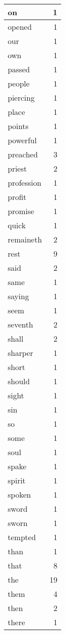 \begin{center}
\begin{longtable}{l|r}
on & 1\\ \hline 
opened & 1\\ \hline 
our & 1\\ \hline 
own & 1\\ \hline 
passed & 1\\ \hline 
people & 1\\ \hline 
piercing & 1\\ \hline 
place & 1\\ \hline 
points & 1\\ \hline 
powerful & 1\\ \hline 
preached & 3\\ \hline 
priest & 2\\ \hline 
profession & 1\\ \hline 
profit & 1\\ \hline 
promise & 1\\ \hline 
quick & 1\\ \hline 
remaineth & 2\\ \hline 
rest & 9\\ \hline 
said & 2\\ \hline 
same & 1\\ \hline 
saying & 1\\ \hline 
seem & 1\\ \hline 
seventh & 2\\ \hline 
shall & 2\\ \hline 
sharper & 1\\ \hline 
short & 1\\ \hline 
should & 1\\ \hline 
sight & 1\\ \hline 
sin & 1\\ \hline 
so & 1\\ \hline 
some & 1\\ \hline 
soul & 1\\ \hline 
spake & 1\\ \hline 
spirit & 1\\ \hline 
spoken & 1\\ \hline 
sword & 1\\ \hline 
sworn & 1\\ \hline 
tempted & 1\\ \hline 
than & 1\\ \hline 
that & 8\\ \hline 
the & 19\\ \hline 
them & 4\\ \hline 
then & 2\\ \hline 
there & 1\\ \hline 

\end{longtable}
\end{center}
